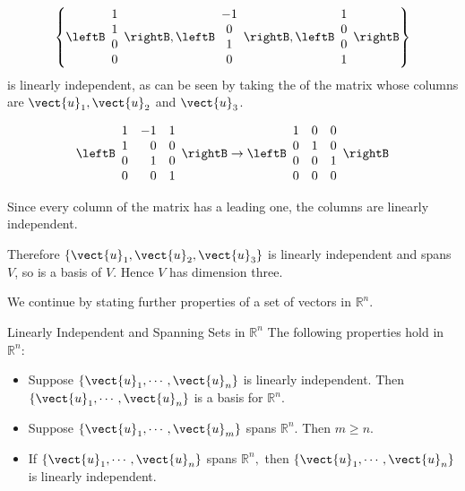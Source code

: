\begin{solution}
\[\left\{ 
\leftB\begin{array}{c} 1\\ 1\\ 0\\ 0\end{array}\rightB,
\leftB\begin{array}{c} -1\\ 0\\ 1\\ 0\end{array}\rightB,
\leftB\begin{array}{c} 1\\ 0\\ 0\\ 1\end{array}\rightB \right\}\]
is linearly independent, as can be seen by taking the
\rref\; of the matrix whose columns are
$\vect{u}_1, \vect{u}_2$ and $\vect{u}_3$.

\[ \leftB\begin{array}{rrr}
1 & -1 & 1 \\
1 & 0 & 0 \\
0 & 1 & 0 \\
0 & 0 & 1 \end{array}\rightB
\rightarrow
\leftB\begin{array}{rrr}
1 & 0 & 0 \\
0 & 1 & 0 \\
0 & 0 & 1 \\
0 & 0 & 0 \end{array}\rightB
\]

Since every column of the \rref\; matrix has a leading one,
the columns are linearly independent.

Therefore $\{ \vect{u}_1, \vect{u}_2, \vect{u}_3 \}$ is linearly
independent and spans $V$, so is a basis of $V$. Hence 
$V$ has dimension three.
\end{solution}

We continue by stating further properties of a set of vectors in  $\mathbb{R}^{n}$.

\begin{corollary}{Linearly Independent and Spanning Sets in  $\mathbb{R}^{n}$}\label{cor:independentspanningRn}
The following properties hold in $\mathbb{R}^{n}$:
\begin{itemize}
\item Suppose $\left\{ \vect{u}_{1},\cdots ,\vect{u}_{n}\right\} $ is linearly independent. Then $\left\{ \vect{u}_{1},\cdots ,\vect{u}_{n}\right\} $ is a basis for $\mathbb{R}^{n}$. 
\item Suppose $\left\{ \vect{u}_{1},\cdots ,\vect{u}_{m}\right\} $ spans $\mathbb{R}^{n}.$ Then $m\geq n.$
\item If $\left\{ \vect{u}_{1},\cdots ,\vect{u}_{n}\right\} $ spans $\mathbb{R}^{n},$ then $\left\{ \vect{u}_{1},\cdots ,\vect{u}_{n}\right\} $ is
linearly independent.
\end{itemize}
\end{corollary}

